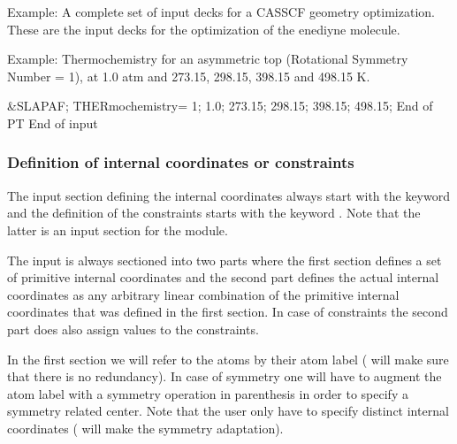 Example: A complete set of input decks for a CASSCF geometry
optimization. These are the input decks for the optimization
of the enediyne molecule.


Example: Thermochemistry for an asymmetric top (Rotational Symmetry Number
 = 1), at 1.0 atm and 273.15, 298.15, 398.15 and 498.15 K.
\begin{inputlisting}
 &SLAPAF; THERmochemistry= 1; 1.0; 273.15; 298.15; 398.15; 498.15; End of PT
End of input
\end{inputlisting}

\subsubsection{Definition of internal coordinates or constraints}
\label{UG:sec:definition_of_internal_coordinates}

The input section defining the internal coordinates always start with the
keyword  and the definition of the constraints
starts with the keyword . Note that the latter
is an input section for the  module.

The input is always sectioned into two
parts where the first section defines a set of primitive internal
coordinates
and the second part defines the actual internal coordinates as
any arbitrary linear combination of the primitive internal coordinates
that was defined in the first section.
In case of constraints the second part does also assign values to the
constraints.

In the first section we will refer to the atoms by their atom label
( will make sure that there is no redundancy). In case of
symmetry one will have to augment the atom label with a symmetry operation
in parenthesis in order to specify a symmetry related center.
Note that the user only
have to specify distinct internal coordinates ( will make the
symmetry adaptation).

